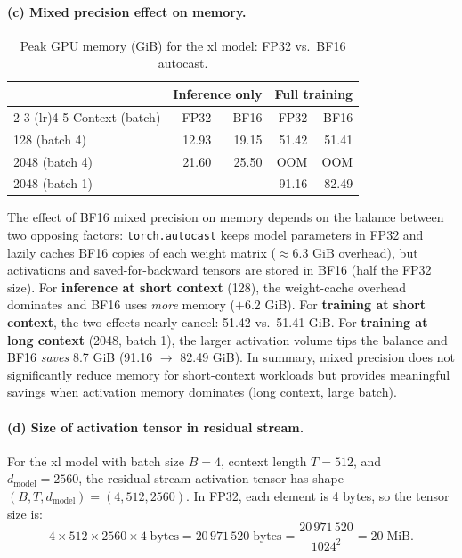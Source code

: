 \documentclass[11pt]{article}
\begin{document}
\paragraph{(c) Mixed precision effect on memory.}

\begin{table}[h]
\centering
\caption{Peak GPU memory (GiB) for the xl model: FP32 vs.\ BF16 autocast.}\label{tab:mixed-mem}
\begin{tabular}{l rr rr}
\toprule
& \multicolumn{2}{c}{Inference only} & \multicolumn{2}{c}{Full training} \\
\cmidrule(lr){2-3} \cmidrule(lr){4-5}
Context (batch) & FP32 & BF16 & FP32 & BF16 \\
\midrule
128 (batch 4)  & 12.93 & 19.15 & 51.42 & 51.41 \\
2048 (batch 4) & 21.60 & 25.50 & OOM   & OOM   \\
2048 (batch 1) & ---   & ---   & 91.16 & 82.49 \\
\bottomrule
\end{tabular}
\end{table}

The effect of BF16 mixed precision on memory depends on the
balance between two opposing factors:
\texttt{torch.autocast} keeps model parameters in FP32 and lazily
caches BF16 copies of each weight matrix ($\approx$6.3 GiB overhead),
but activations and saved-for-backward tensors are stored in BF16
(half the FP32 size).
For \textbf{inference at short context} (128), the weight-cache
overhead dominates and BF16 uses \emph{more} memory ($+$6.2 GiB).
For \textbf{training at short context}, the two effects nearly cancel:
51.42 vs.\ 51.41 GiB.
For \textbf{training at long context} (2048, batch 1), the larger
activation volume tips the balance and BF16 \emph{saves} 8.7 GiB
(91.16 $\to$ 82.49 GiB).
In summary, mixed precision does not significantly reduce memory for
short-context workloads but provides meaningful savings when
activation memory dominates (long context, large batch).

\paragraph{(d) Size of activation tensor in residual stream.}

For the xl model with batch size $B{=}4$, context length $T{=}512$,
and $d_\text{model}{=}2560$, the residual-stream activation tensor
has shape $(B, T, d_\text{model}) = (4, 512, 2560)$.  In FP32,
each element is 4 bytes, so the tensor size is:
\[
  4 \times 512 \times 2560 \times 4 \;\text{bytes}
  = 20\,971\,520 \;\text{bytes}
  = \frac{20\,971\,520}{1024^2} = 20 \;\text{MiB}.
\]
\end{document}
